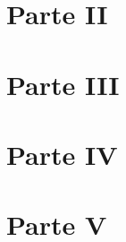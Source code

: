 \documentclass[8pt]{beamer}
\begin{document}
\section{Parte II}

\section{Parte III}

\section{Parte IV}

\section{Parte V}
\end{document}

